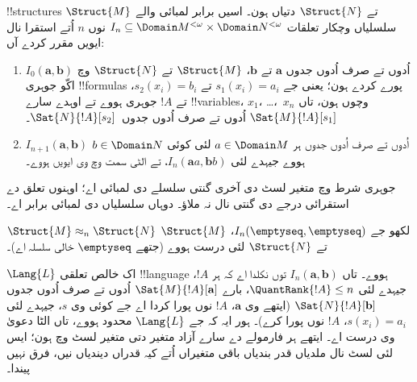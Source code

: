 \documentclass[../../../include/open-logic-section]{subfiles}
\begin{document}
\begin{defn}
  !!{structure}s $\Struct{M}$ تے $\Struct{N}$ دتیاں ہون۔
  اسیں برابر لمبائی والے سلسلیاں وچکار تعلقات
  $I_n \subseteq \Domain M^{<\omega} \times \Domain N^{<\omega}$
  نوں $n$ اُتے استقرا نال ایویں مقرر کردے آں:
   \begin{enumerate}
   \item $I_0(\mathbf{a},\mathbf{b})$ اُدوں تے صرف اُدوں جدوں
     $\mathbf{a}$ تے $\mathbf{b}$، $\Struct{M}$ تے
     $\Struct{N}$ وچ اکّو جوہری !!{formula}s پورے کردے ہون؛ یعنی
     جے $s_1(x_i) = a_i$ تے $s_2(x_i) =
     b_i$، تے $!A$ جوہری ہووے تے اوہدے سارے !!{variable}s،
     $x_1$، \dots،~$x_n$ وچوں ہون، تاں $\Sat{M}{!A}[s_1]$ اُدوں تے
     صرف اُدوں جدوں~$\Sat{N}{!A}[s_2]$۔
   \item $I_{n+1} (\mathbf{a},\mathbf{b})$ اُدوں تے صرف اُدوں جدوں ہر
     $a\in \Domain M$ لئی کوئی $b\in \Domain N$ ہووے جیہدے لئی $I_n
     (\mathbf{a}a,\mathbf{b}b)$، تے الٹی سمت وچ وی ایویں ہووے۔
   \end{enumerate}
  جوہری شرط وچ متغیر لسٹ دی آخری گنتی سلسلے دی لمبائی اے؛ اوہنوں
  تعلق دے استقرائی درجے دی گنتی نال نہ ملاؤ۔ دوہاں سلسلیاں دی لمبائی برابر اے۔
\end{defn}


\begin{defn}
  $\Struct{M} \approx_n \Struct{N}$ لکھو جے
  $I_n(\emptyseq,\emptyseq)$، $\Struct{M}$ تے
  $\Struct{N}$ لئی درست ہووے (جتھے $\emptyseq$ خالی سلسلہ اے)۔
\end{defn}

\begin{thm}
  $\Lang{L}$ اک خالص تعلقی !!{language} ہووے۔ تاں $I_n
  (\mathbf{a},\mathbf{b})$ توں نکلدا اے کہ ہر $!A$، جیہدے لئی
  $\QuantRank{!A} \le n$، بارے $\Sat{M}{!A}[\mathbf{a}]$ اُدوں تے
  صرف اُدوں جدوں $\Sat{N}{!A}[\mathbf{b}]$ (ایتھے وی $\mathbf{a}$،
  $!A$ نوں پورا کردا اے جے کوئی وی $s$، جیہدے لئی
  $s(x_i) = a_i$، $!A$ نوں پورا کرے)۔ ہور ایہ کہ جے $\Lang{L}$
  محدود ہووے، تاں الٹا دعویٰ وی درست اے۔
  ایتھے ہر فارمولے دے سارے آزاد متغیر دتی متغیر لسٹ وچ ہون؛ ایس لئی
  لسٹ نال ملدیاں قدر بندیاں باقی متغیراں اُتے کیہ قدراں دیندیاں نیں، فرق نہیں پیندا۔
\end{thm}
\end{document}
